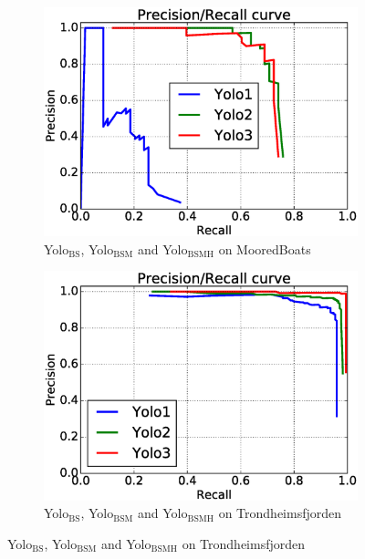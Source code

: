 \begin{figure}[h!]
\captionsetup[subfigure]{justification=centering}
\begin{subfigure}{.5\textwidth}
  \centering
  \includegraphics[width=0.8\linewidth]{results/case_tr_moor/prec_recall/bb.eps}
  \caption{Yolo$_{\text{BS}}$, Yolo$_{\text{BSM}}$ and Yolo$_{\text{BSMH}}$ on MooredBoats}
  \label{fig:moor_bb}
\end{subfigure}%
\begin{subfigure}{.5\textwidth}
  \centering
  \includegraphics[width=.8\linewidth]{results/case_tr_moor/prec_recall/trf.eps}
  \caption{Yolo$_{\text{BS}}$, Yolo$_{\text{BSM}}$ and Yolo$_{\text{BSMH}}$  on Trondheimsfjorden}
  \label{fig:moor_trf}
\end{subfigure}


\end{figure}
